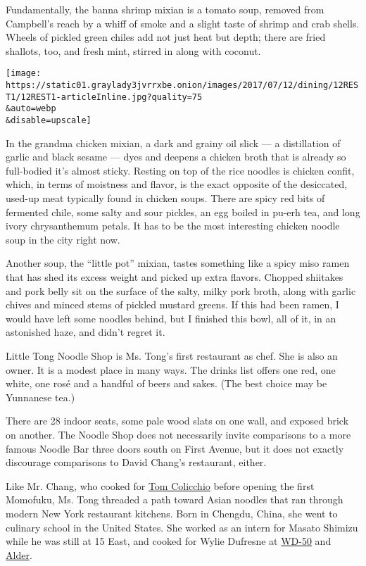 Fundamentally, the banna shrimp mixian is a tomato soup, removed from
Campbell's reach by a whiff of smoke and a slight taste of shrimp and
crab shells. Wheels of pickled green chiles add not just heat but depth;
there are fried shallots, too, and fresh mint, stirred in along with
coconut.

\texttt{[image: https://static01.graylady3jvrrxbe.onion/images/2017/07/12/dining/12REST1/12REST1-articleInline.jpg?quality=75\\\&auto=webp\\\&disable=upscale]}

In the grandma chicken mixian, a dark and grainy oil slick --- a
distillation of garlic and black sesame --- dyes and deepens a chicken
broth that is already so full-bodied it's almost sticky. Resting on top
of the rice noodles is chicken confit, which, in terms of moistness and
flavor, is the exact opposite of the desiccated, used-up meat typically
found in chicken soups. There are spicy red bits of fermented chile,
some salty and sour pickles, an egg boiled in pu-erh tea, and long ivory
chrysanthemum petals. It has to be the most interesting chicken noodle
soup in the city right now.

Another soup, the ``little pot'' mixian, tastes something like a spicy
miso ramen that has shed its excess weight and picked up extra flavors.
Chopped shiitakes and pork belly sit on the surface of the salty, milky
pork broth, along with garlic chives and minced stems of pickled mustard
greens. If this had been ramen, I would have left some noodles behind,
but I finished this bowl, all of it, in an astonished haze, and didn't
regret it.

Little Tong Noodle Shop is Ms. Tong's first restaurant as chef. She is
also an owner. It is a modest place in many ways. The drinks list offers
one red, one white, one rosé and a handful of beers and sakes. (The best
choice may be Yunnanese tea.)

There are 28 indoor seats, some pale wood slats on one wall, and exposed
brick on another. The Noodle Shop does not necessarily invite
comparisons to a more famous Noodle Bar three doors south on First
Avenue, but it does not exactly discourage comparisons to David Chang's
restaurant, either.

Like Mr. Chang, who cooked for
\href{https://www.nytimes3xbfgragh.onion/2017/05/05/well/eat/farmers-market-shopping-with-the-chef-tom-colicchio.html}{Tom
Colicchio} before opening the first Momofuku, Ms. Tong threaded a path
toward Asian noodles that ran through modern New York restaurant
kitchens. Born in Chengdu, China, she went to culinary school in the
United States. She worked as an intern for Masato Shimizu while he was
still at 15 East, and cooked for Wylie Dufresne at
\href{https://www.nytimes3xbfgragh.onion/2014/06/11/dining/chef-says-hell-close-wd-50.html}{WD-50}
and
\href{http://www.nytimes3xbfgragh.onion/2013/07/10/dining/reviews/restaurant-review-alder-in-the-east-village.html}{Alder}.

